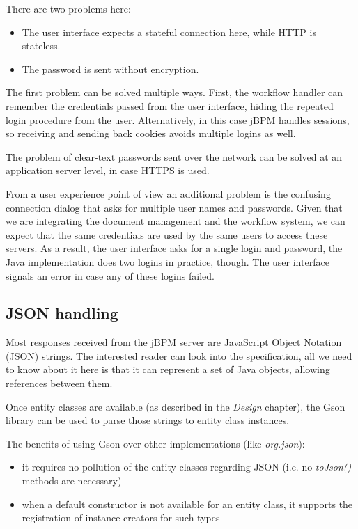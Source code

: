 There are two problems here:

\begin{itemize}
\item The user interface expects a stateful connection here, while HTTP is stateless.
\item The password is sent without encryption.
\end{itemize}

The first problem can be solved multiple ways. First, the workflow handler can
remember the credentials passed from the user interface, hiding the repeated
login procedure from the user. Alternatively, in this case jBPM handles
sessions, so receiving and sending back cookies avoids multiple logins as well.

The problem of clear-text passwords sent over the network can be solved at an
application server level, in case HTTPS is used.

From a user experience point of view an additional problem is the confusing
connection dialog that asks for multiple user names and passwords. Given that
we are integrating the document management and the workflow system, we can
expect that the same credentials are used by the same users to access these
servers. As a result, the user interface asks for a single login and password,
the Java implementation does two logins in practice, though. The user interface
signals an error in case any of these logins failed.

\subsection{JSON handling}

Most responses received from the jBPM server are JavaScript Object Notation
(JSON) strings. The interested reader can look into the
specification\cite{json}, all we need to know about it here is that it can
represent a set of Java objects, allowing references between them.

Once entity classes are available (as described in the \emph{Design} chapter),
the Gson library\cite{gson} can be used to parse those strings to entity class
instances.

The benefits of using Gson over other implementations (like
\emph{org.json}\cite{org-json}):

\begin{itemize}
\item it requires no pollution of the entity classes regarding JSON (i.e. no \emph{toJson()} methods are necessary)
\item when a default constructor is not available for an entity class, it supports the registration of instance creators for such types
\end{itemize}

